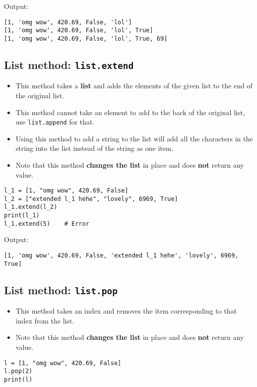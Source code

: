 \documentclass[11pt]{article}
\begin{document}
 \noindent Output:

\label{orgae1c511}
\begin{verbatim}
[1, 'omg wow', 420.69, False, 'lol']
[1, 'omg wow', 420.69, False, 'lol', True]
[1, 'omg wow', 420.69, False, 'lol', True, 69]
\end{verbatim}


 \newpage
\subsection{List method: \texttt{list.extend}}
\label{sec:orgf802e92}
\begin{itemize}
\item This method takes a \textbf{list} and adds the elements of the given list to the end of the original list.
\item This method cannot take an element to add to the back of the original list, use \texttt{list.append} for that.
\item Using this method to add a string to the list will add all the characters in the string into the list instead of the string as one item.
\item Note that this method \textbf{changes the list} in place and does \textbf{not} return any value.
\end{itemize}

\begin{verbatim}
l_1 = [1, "omg wow", 420.69, False]
l_2 = ["extended l_1 hehe", "lovely", 6969, True]
l_1.extend(l_2)
print(l_1)
l_1.extend(5)    # Error
\end{verbatim}

 \noindent Output:

\label{orga3c9666}
\begin{verbatim}
[1, 'omg wow', 420.69, False, 'extended l_1 hehe', 'lovely', 6969, True]
\end{verbatim}
\subsection{List method: \texttt{list.pop}}
\label{sec:org504863f}
\begin{itemize}
\item This method takes an index and removes the item corresponding to that index from the list.
\item Note that this method \textbf{changes the list} in place and does \textbf{not} return any value.
\end{itemize}
\begin{verbatim}
l = [1, "omg wow", 420.69, False]
l.pop(2)
print(l)
\end{verbatim}
\end{document}
